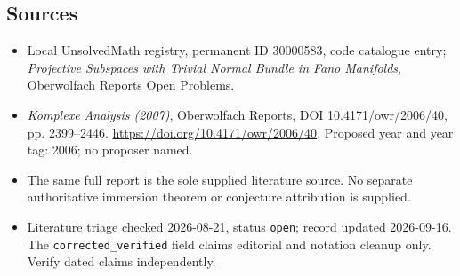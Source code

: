 \documentclass[11pt]{article}
\begin{document}
\subsection{Sources}
\begin{itemize}\item Local UnsolvedMath registry, permanent ID 30000583, code catalogue entry; \emph{Projective Subspaces with Trivial Normal Bundle in Fano Manifolds}, Oberwolfach Reports Open Problems.\item \emph{Komplexe Analysis (2007)}, Oberwolfach Reports, DOI 10.4171/owr/2006/40, pp. 2399--2446. \url{https://doi.org/10.4171/owr/2006/40}. Proposed year and year tag: 2006; no proposer named.\item The same full report is the sole supplied literature source. No separate authoritative immersion theorem or conjecture attribution is supplied.\item Literature triage checked 2026-08-21, status \texttt{open}; record updated 2026-09-16. The \texttt{corrected\_verified} field claims editorial and notation cleanup only. Verify dated claims independently.\end{itemize}
\end{document}
